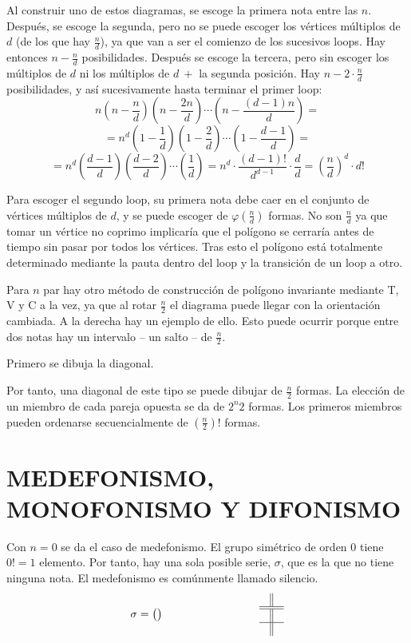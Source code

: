 		Al construir uno de estos diagramas, se escoge la primera nota entre las $n$. Después, se escoge la segunda, pero no se puede escoger los vértices múltiplos de $d$ (de los que hay $\frac{n}{d}$), ya que van a ser el comienzo de los sucesivos loops. Hay entonces $n-\frac{n}{d}$ posibilidades. Después se escoge la tercera, pero sin escoger los múltiplos de $d$ ni los múltiplos de $d\ +$ la segunda posición. Hay $n - 2\cdot\frac{n}{d}$ posibilidades, y así sucesivamente hasta terminar el primer loop:
		$$n\left(n-\frac{n}{d}\right)\left(n-\frac{2n}{d}\right)\cdots\left(n-\frac{(d-1)n}{d}\right)=$$ 
		$$=n^d\left(1-\frac{1}{d}\right)\left(1-\frac{2}{d}\right)\cdots\left(1-\frac{d-1}{d}\right)=$$
		$$=n^d\left(\frac{d-1}{d}\right)\left(\frac{d-2}{d}\right)\cdots\left(\frac{1}{d}\right)=n^d\cdot\frac{(d-1)!}{d^{d-1}}\cdot\frac{d}{d}=\left(\frac{n}{d}\right)^d\cdot d!$$
		
		Para escoger el segundo loop, su primera nota debe caer en el conjunto de vértices múltiplos de $d$, y se puede escoger de $\varphi\left(\frac{n}{d}\right)$ formas. No son $\frac{n}{d}$ ya que tomar un vértice no coprimo implicaría que el polígono se cerraría antes de tiempo sin pasar por todos los vértices. Tras esto el polígono está totalmente determinado mediante la pauta dentro del loop y la transición de un loop a otro.
		
		Para $n$ par hay otro método de construcción de polígono invariante mediante T, V y C a la vez, ya que al rotar $\frac{n}{2}$ el diagrama puede llegar con la orientación cambiada. A la derecha hay un ejemplo de ello. Esto puede ocurrir porque entre dos notas hay un intervalo -- un salto -- de $\frac{n}{2}$.
		
		Primero se dibuja la diagonal.
		
		Por tanto, una diagonal de este tipo se puede dibujar de $\frac{n}{2}$ formas. La elección de un miembro de cada pareja opuesta se da de $2^{n}{2}$ formas. Los primeros miembros pueden ordenarse secuencialmente de $\left(\frac{n}{2}\right)!$ formas.
	
	\newpage
		
	\section{MEDEFONISMO, MONOFONISMO Y DIFONISMO}
	\label{monodi}
		Con $n=0$ se da el caso de medefonismo. El grupo simétrico de orden 0 tiene $0!=1$ elemento. Por tanto, hay una sola posible serie, $\sigma$, que es la que no tiene ninguna nota. El medefonismo es comúnmente llamado silencio.
		$$\sigma=\left(\begin{matrix}\\\end{matrix}\right)\hspace{3cm}\begin{array}{l||r}&\\\hline\hline&\\\hline&\end{array}$$
	
